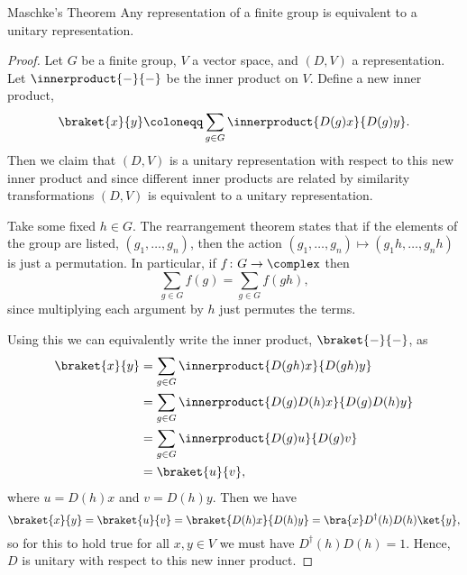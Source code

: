 \documentclass[fleqn]{NotesClass}
\newcommand{\ident}{1}
\newcommand{\hermit}{\dagger}
\begin{document}
    \begin{thm}{Maschke's Theorem}{}
        Any representation of a finite group is equivalent to a unitary representation.
        \begin{proof}
            Let \(G\) be a finite group, \(V\) a vector space, and \((D, V)\) a representation.
            Let \(\innerproduct{-}{-}\) be the inner product on \(V\).
            Define a new inner product,
            \begin{equation}
                \braket{x}{y} \coloneqq \sum_{g \in G} \innerproduct{D(g)x}{D(g)y}.
            \end{equation}
            Then we claim that \((D, V)\) is a unitary representation with respect to this new inner product and since different inner products are related by similarity transformations \((D, V)\) is equivalent to a unitary representation.
            
            Take some fixed \(h \in G\).
            The rearrangement theorem states that if the elements of the group are listed, \((g_1, \dotsc, g_n)\), then the action \((g_1, \dotsc, g_n) \mapsto (g_1h, \dotsc, g_nh)\) is just a permutation.
            In particular, if \(f \colon G \to \complex\) then
            \begin{equation}
                \sum_{g \in G} f(g) = \sum_{g\in G} f(gh),
            \end{equation}
            since multiplying each argument by \(h\) just permutes the terms.
            
            Using this we can equivalently write the inner product, \(\braket{-}{-}\), as
            \begin{align}
                \braket{x}{y} &= \sum_{g\in G} \innerproduct{D(gh)x}{D(gh)y}\\
                &= \sum_{g\in G} \innerproduct{D(g)D(h)x}{D(g)D(h)y}\\
                &= \sum_{g\in G} \innerproduct{D(g)u}{D(g)v}\\
                &= \braket{u}{v},
            \end{align}
            where \(u = D(h)x\) and \(v = D(h)y\).
            Then we have
            \begin{equation}
                \braket{x}{y} = \braket{u}{v} = \braket{D(h)x}{D(h)y} = \bra{x}D^\hermit(h)D(h)\ket{y},
            \end{equation}
            so for this to hold true for all \(x, y \in V\) we must have \(D^\hermit(h)D(h) = \ident\).
            Hence, \(D\) is unitary with respect to this new inner product.
        \end{proof}
    \end{thm}
    
\end{document}
